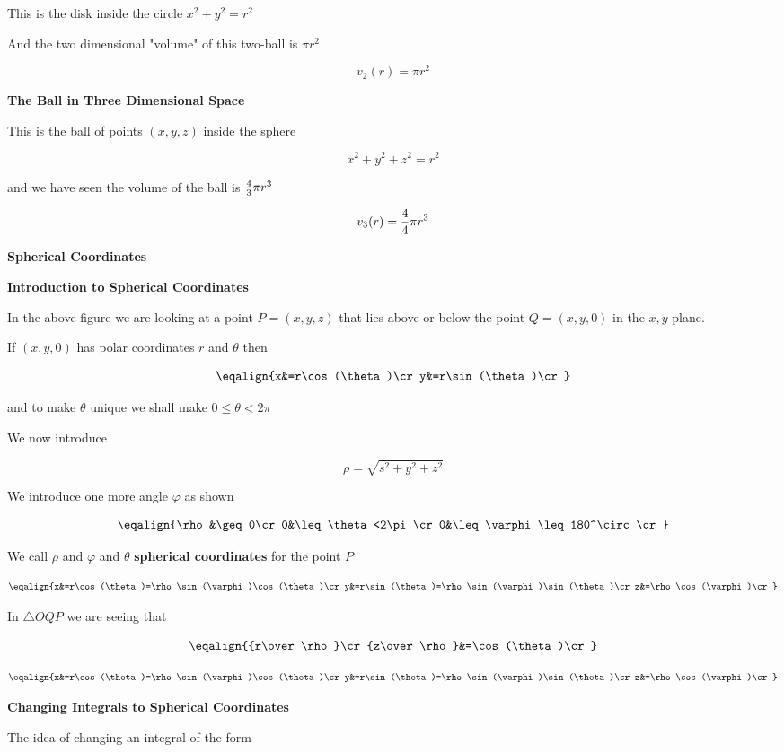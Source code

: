 \vskip 1mm
This is the disk inside the circle $x^2+y^2=r^2$

\vskip 1mm
And the two dimensional "volume" of this two-ball is $\pi r^2$

$$v_2(r)=\pi r^2$$

\filbreak
\vskip 1mm
{\bf The Ball in Three Dimensional Space}

\vskip 1mm
This is the ball of points $(x,y,z)$ inside the sphere

$$x^2+y^2+z^2=r^2$$

and we have seen the volume of the ball is ${4\over 3}\pi r^3$

$$v_3(r)={4\over 4}\pi r^3$$

\filbreak


\filbreak
\vskip 1cm
{\bf Spherical Coordinates}

\vskip 1mm
{\bf Introduction to Spherical Coordinates}

\vskip 1mm
In the above figure we are looking at a point $P=(x,y,z)$ that lies above or below the point $Q=(x,y,0)$ in the $x,y$ plane.

\vskip 1mm
If $(x,y,0)$ has polar coordinates $r$ and $\theta$ then

$$\eqalign{x&=r\cos(\theta)\cr
	y&=r\sin(\theta)\cr}$$

and to make $\theta$ unique we shall make $0\leq\theta<2\pi$

\vskip 1mm
We now introduce

$$\rho=\sqrt{s^2+y^2+z^2}$$

We introduce one more angle $\varphi$ as shown

$$\eqalign{\rho&\geq 0\cr
	0&\leq\theta<2\pi\cr
	0&\leq\varphi\leq 180^\circ\cr}$$

We call $\rho$ and $\varphi$ and $\theta$ {\bf spherical coordinates} for the point $P$

$$\eqalign{x&=r\cos(\theta)=\rho\sin(\varphi)\cos(\theta)\cr
	y&=r\sin(\theta)=\rho\sin(\varphi)\sin(\theta)\cr
	z&=\rho\cos(\varphi)\cr}$$

In $\triangle OQP$ we are seeing that

$$\eqalign{{r\over\rho}\cr
		{z\over\rho}&=\cos(\theta)\cr}$$

$$\eqalign{x&=r\cos(\theta)=\rho\sin(\varphi)\cos(\theta)\cr
	y&=r\sin(\theta)=\rho\sin(\varphi)\sin(\theta)\cr
	z&=\rho\cos(\varphi)\cr}$$

\filbreak
\vskip 1cm
{\bf Changing Integrals to Spherical Coordinates}

\vskip 1mm
The idea of changing an integral of the form

